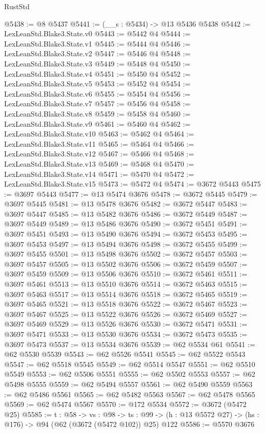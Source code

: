 \begin{lexlean}{RustStd}
\begin{coremodule}
@5438 := @8 @5437
@5441 := (__s : @5434) -> @13 @5436 @5438
@5442 := LexLeanStd.Blake3.State.v0
@5443 := @5442 @4
@5444 := LexLeanStd.Blake3.State.v1
@5445 := @5444 @4
@5446 := LexLeanStd.Blake3.State.v2
@5447 := @5446 @4
@5448 := LexLeanStd.Blake3.State.v3
@5449 := @5448 @4
@5450 := LexLeanStd.Blake3.State.v4
@5451 := @5450 @4
@5452 := LexLeanStd.Blake3.State.v5
@5453 := @5452 @4
@5454 := LexLeanStd.Blake3.State.v6
@5455 := @5454 @4
@5456 := LexLeanStd.Blake3.State.v7
@5457 := @5456 @4
@5458 := LexLeanStd.Blake3.State.v8
@5459 := @5458 @4
@5460 := LexLeanStd.Blake3.State.v9
@5461 := @5460 @4
@5462 := LexLeanStd.Blake3.State.v10
@5463 := @5462 @4
@5464 := LexLeanStd.Blake3.State.v11
@5465 := @5464 @4
@5466 := LexLeanStd.Blake3.State.v12
@5467 := @5466 @4
@5468 := LexLeanStd.Blake3.State.v13
@5469 := @5468 @4
@5470 := LexLeanStd.Blake3.State.v14
@5471 := @5470 @4
@5472 := LexLeanStd.Blake3.State.v15
@5473 := @5472 @4
@5474 := @3672 @5443
@5475 := @3697 @5443
@5477 := @13 @5474 @3676
@5478 := @3672 @5445
@5479 := @3697 @5445
@5481 := @13 @5478 @3676
@5482 := @3672 @5447
@5483 := @3697 @5447
@5485 := @13 @5482 @3676
@5486 := @3672 @5449
@5487 := @3697 @5449
@5489 := @13 @5486 @3676
@5490 := @3672 @5451
@5491 := @3697 @5451
@5493 := @13 @5490 @3676
@5494 := @3672 @5453
@5495 := @3697 @5453
@5497 := @13 @5494 @3676
@5498 := @3672 @5455
@5499 := @3697 @5455
@5501 := @13 @5498 @3676
@5502 := @3672 @5457
@5503 := @3697 @5457
@5505 := @13 @5502 @3676
@5506 := @3672 @5459
@5507 := @3697 @5459
@5509 := @13 @5506 @3676
@5510 := @3672 @5461
@5511 := @3697 @5461
@5513 := @13 @5510 @3676
@5514 := @3672 @5463
@5515 := @3697 @5463
@5517 := @13 @5514 @3676
@5518 := @3672 @5465
@5519 := @3697 @5465
@5521 := @13 @5518 @3676
@5522 := @3672 @5467
@5523 := @3697 @5467
@5525 := @13 @5522 @3676
@5526 := @3672 @5469
@5527 := @3697 @5469
@5529 := @13 @5526 @3676
@5530 := @3672 @5471
@5531 := @3697 @5471
@5533 := @13 @5530 @3676
@5534 := @3672 @5473
@5535 := @3697 @5473
@5537 := @13 @5534 @3676
@5539 := @62 @5534 @61
@5541 := @62 @5530 @5539
@5543 := @62 @5526 @5541
@5545 := @62 @5522 @5543
@5547 := @62 @5518 @5545
@5549 := @62 @5514 @5547
@5551 := @62 @5510 @5549
@5553 := @62 @5506 @5551
@5555 := @62 @5502 @5553
@5557 := @62 @5498 @5555
@5559 := @62 @5494 @5557
@5561 := @62 @5490 @5559
@5563 := @62 @5486 @5561
@5565 := @62 @5482 @5563
@5567 := @62 @5478 @5565
@5569 := @62 @5474 @5567
@5570 := @172 @5534
@5572 := @3672 (@5472 @25)
@5585 := {t : @58} ->
  {vs : @98} ->
  {ts : @99} -> (h : @13 @5572 @27) -> (hs : @176) -> @94 (@62 (@3672 (@5472 @102)) @25) @122
@5586 := @5570 @3676

\end{coremodule}
\end{lexlean}
